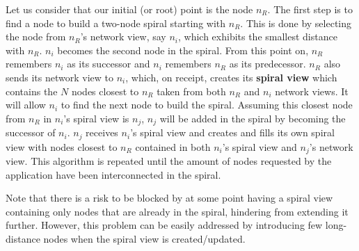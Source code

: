 Let us consider that our initial (or root) point is the node $n_R$. The first
step is to find a node to build a two-node spiral starting with $n_R$. This is
done by selecting the node from $n_R$'s network view, say $n_i$, which exhibits
the smallest distance with $n_R$. $n_i$ becomes the second node in the
spiral. From this point on, $n_R$ remembers $n_i$ as its successor and $n_i$
remembers $n_R$ as its predecessor. $n_R$ also sends its network view to $n_i$,
which, on receipt, creates its {\bf spiral view} which contains the $N$ nodes
closest to $n_R$ taken from both $n_R$ and $n_i$ network views. It will allow
$n_i$ to find the next node to build the spiral. Assuming this closest node from
$n_R$ in $n_i$'s spiral view is $n_j$, $n_j$ will be added in the spiral by
becoming the successor of $n_i$. $n_j$ receives $n_i$'s spiral view and creates
and fills its own spiral view with nodes closest to $n_R$ contained in both
$n_i$'s spiral view and $n_j$'s network view. This algorithm is repeated until
the amount of nodes requested by the application have been interconnected in the
spiral.

Note that there is a risk to be blocked by at some point having a spiral view
containing only nodes that are already in the spiral, hindering from extending
it further. However, this problem can be easily addressed by introducing few
long-distance nodes when the spiral view is created/updated.

